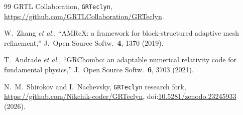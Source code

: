 \documentclass[twocolumn,floatfix,aps,prd,superscriptaddress,nofootinbib]{revtex4-2}
\begin{document}
\begin{thebibliography}{99}
GRTL Collaboration,
\newblock \texttt{GRTeclyn},
\newblock \url{https://github.com/GRTLCollaboration/GRTeclyn}.

W.~Zhang \emph{et al.},
\newblock ``AMReX: a framework for block-structured adaptive mesh refinement,''
\newblock J.\ Open Source Softw.\ \textbf{4}, 1370 (2019).

T.~Andrade \emph{et al.},
\newblock ``GRChombo: an adaptable numerical relativity code for fundamental physics,''
\newblock J.\ Open Source Softw.\ \textbf{6}, 3703 (2021).

N.~M.~Shirokov and I.~Nachevsky,
\newblock \texttt{GRTeclyn} research fork,
\newblock \url{https://github.com/Nikchik-coder/GRTeclyn},
\newblock doi:\href{https://doi.org/10.5281/zenodo.23245933}{10.5281/zenodo.23245933} (2026).

\end{thebibliography}
\end{document}
